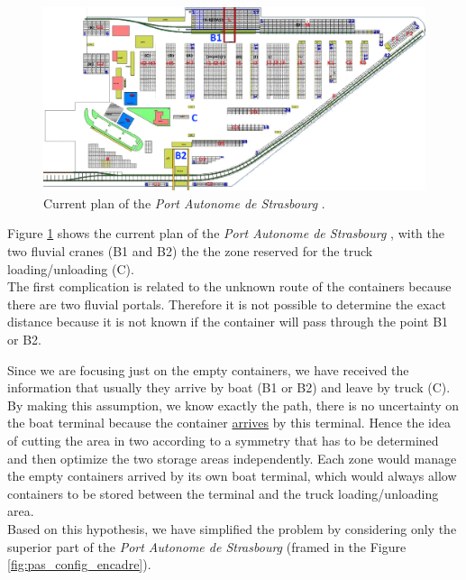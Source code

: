 \documentclass{article}
\newcommand{\PAS}{\emph{Port Autonome de Strasbourg }}
\begin{document}
\begin{figure}[!htb]
\centering
\includegraphics[width=\linewidth]{images/Plan_Terminal_modifie.png}
\caption{Current plan of the \PAS.}
\label{fig:pas_config_modif}
\end{figure}

Figure \ref{fig:pas_config_modif} shows the current plan of the \PAS, with the two fluvial cranes (B1 and B2) the the zone reserved for the truck loading/unloading (C). \\
The first complication is related to the unknown route of the containers because there are two fluvial portals. 
Therefore it is not possible to determine the exact distance because it is not known if the container will pass through the point B1 or B2.

Since we are focusing just on the empty containers, we have received the information that usually they arrive by boat (B1 or B2) and leave by truck (C).
By making this assumption, we know exactly the path, there is no uncertainty on the boat terminal because the container \underline{arrives} by this terminal. 
Hence the idea of cutting the area in two according to a symmetry that has to be determined and then optimize the two storage areas independently. 
Each zone would manage the empty containers arrived by its own boat terminal, which would always allow containers to be stored between the terminal and the truck loading/unloading area. \\


Based on this hypothesis, we have simplified the problem by considering only the superior part of the \PAS (framed in the Figure \ref{fig:pas_config_encadre}).
\end{document}
